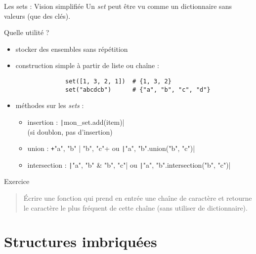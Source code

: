 \documentclass[10pt]{beamer}
\begin{document}
\begin{frame}[fragile]{Les sets : Vision simplifiée}
  Un \emph{set} peut être vu comme un \alert{dictionnaire sans valeurs} (que des clés).

  Quelle utilité ?
  \begin{itemize}
    \item stocker des ensembles sans répétition
    \item construction simple à partir de liste ou chaîne :
          \begin{beamercodeblock}
            \begin{verbatim}
              set([1, 3, 2, 1])  # {1, 3, 2}
              set("abcdcb")      # {"a", "b", "c", "d"}
            \end{verbatim}
          \end{beamercodeblock}
    \item méthodes sur les \emph{sets} :
    \begin{itemize}
      \item insertion :    \texttt|mon_set.add(item)| \\ (si doublon, pas d'insertion)
      \item union     :    \texttt+{"a", "b"} | {"b", "c"}+ ou \texttt|{"a", "b"}.union({"b", "c"})|
      \item intersection : \texttt|{"a", "b"} & {"b", "c"}| ou \texttt|{"a", "b"}.intersection({"b", "c"})|
    \end{itemize}
  \end{itemize}
\end{frame}

\begin{frame}[fragile]{Exercice}
  \begin{quote}
    Écrire une fonction qui prend en entrée une chaîne de caractère et retourne le caractère le plus fréquent de cette chaîne (sans utiliser de dictionnaire).
  \end{quote}
\end{frame}

\section{Structures imbriquées}
\end{document}
